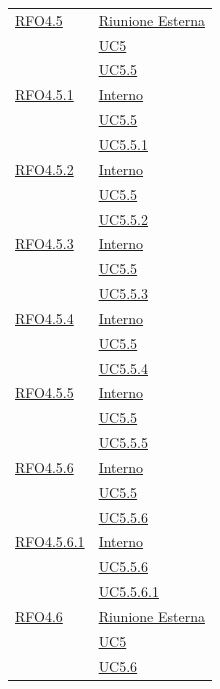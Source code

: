 \begin{itemize}
\begin{itemize}
\begin{itemize}
\begin{itemize}
\begin{longtable}{|>{\centering}m{5cm}|m{5cm}<{\centering}|}
\hyperlink{RFO4.5}{RFO4.5} & \hyperlink{Riunione Esterna}{Riunione Esterna}\\
& \hyperref[UC5]{UC5}\\
& \hyperref[UC5.5]{UC5.5}\\ \hline

\hyperlink{RFO4.5.1}{RFO4.5.1} & \hyperlink{Interno}{Interno}\\
& \hyperref[UC5.5]{UC5.5}\\
& \hyperref[UC5.5.1]{UC5.5.1}\\ \hline

\hyperlink{RFO4.5.2}{RFO4.5.2} & \hyperlink{Interno}{Interno}\\
& \hyperref[UC5.5]{UC5.5}\\
& \hyperref[UC5.5.2]{UC5.5.2}\\ \hline

\hyperlink{RFO4.5.3}{RFO4.5.3} & \hyperlink{Interno}{Interno}\\
& \hyperref[UC5.5]{UC5.5}\\
& \hyperref[UC5.5.3]{UC5.5.3}\\ \hline

\hyperlink{RFO4.5.4}{RFO4.5.4} & \hyperlink{Interno}{Interno}\\
& \hyperref[UC5.5]{UC5.5}\\
& \hyperref[UC5.5.4]{UC5.5.4}\\ \hline

\hyperlink{RFO4.5.5}{RFO4.5.5} & \hyperlink{Interno}{Interno}\\
& \hyperref[UC5.5]{UC5.5}\\
& \hyperref[UC5.5.5]{UC5.5.5}\\ \hline

\hyperlink{RFO4.5.6}{RFO4.5.6} & \hyperlink{Interno}{Interno}\\
& \hyperref[UC5.5]{UC5.5}\\
& \hyperref[UC5.5.6]{UC5.5.6}\\ \hline

\hyperlink{RFO4.5.6.1}{RFO4.5.6.1} & \hyperlink{Interno}{Interno}\\
& \hyperref[UC5.5.6]{UC5.5.6}\\
& \hyperref[UC5.5.6.1]{UC5.5.6.1}\\ \hline

\hyperlink{RFO4.6}{RFO4.6} & \hyperlink{Riunione Esterna}{Riunione Esterna}\\
& \hyperref[UC5]{UC5}\\
& \hyperref[UC5.6]{UC5.6}\\ \hline


\end{longtable}
\end{itemize}
\end{itemize}
\end{itemize}
\end{itemize}
